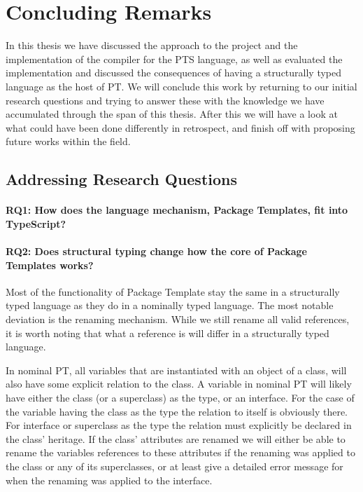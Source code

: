 \chapter{Concluding Remarks}\label{ch:results}

In this thesis we have discussed the approach to the project and the implementation of the compiler for the PTS language, as well as evaluated the implementation and discussed the consequences of having a structurally typed language as the host of PT\@.
We will conclude this work by returning to our initial research questions and trying to answer these with the knowledge we have accumulated through the span of this thesis.
After this we will have a look at what could have been done differently in retrospect, and finish off with proposing future works within the field.


\section{Addressing Research Questions}\label{sec:adressing-research-questions}


\subsubsection{RQ1: How does the language mechanism, Package Templates, fit into TypeScript?}



\subsubsection{RQ2: Does structural typing change how the core of Package Templates works?}

Most of the functionality of Package Template stay the same in a structurally typed language as they do in a nominally typed language.
The most notable deviation is the renaming mechanism.
While we still rename all valid references, it is worth noting that what a reference is will differ in a structurally typed language.

In nominal PT, all variables that are instantiated with an object of a class, will also have some explicit relation to the class.
A variable in nominal PT will likely have either the class (or a superclass) as the type, or an interface.
For the case of the variable having the class as the type the relation to itself is obviously there.
For interface or superclass as the type the relation must explicitly be declared in the class' heritage.
If the class' attributes are renamed we will either be able to rename the variables references to these attributes if the renaming was applied to the class or any of its superclasses, or at least give a detailed error message for when the renaming was applied to the interface.

